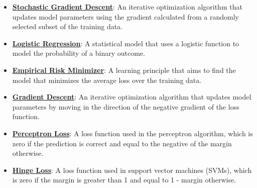 \documentclass{article}%
\begin{document}
\begin{itemize}[leftmargin=*]
\item \href{https://purdue.brightspace.com/d2l/common/assets/pdfjs-d2l-dist/1.0.14-legacy/web/viewer.html?file=%2Fcontent%2Fenforced%2F1095467-wl.202510.CS.24300.001%2F05L2-ML Basics.pdf%3Fou%3D1095467&lang=en-us&container=d2l-fileviewer-rendered-pdf&fullscreen=d2l-fileviewer-rendered-pdf-dialog&height=667#page=29}{\textbf{Stochastic Gradient Descent}}: An iterative optimization algorithm that updates model parameters using the gradient calculated from a randomly selected subset of the training data.%
\item \href{https://purdue.brightspace.com/d2l/common/assets/pdfjs-d2l-dist/1.0.14-legacy/web/viewer.html?file=%2Fcontent%2Fenforced%2F1095467-wl.202510.CS.24300.001%2F05L2-ML Basics.pdf%3Fou%3D1095467&lang=en-us&container=d2l-fileviewer-rendered-pdf&fullscreen=d2l-fileviewer-rendered-pdf-dialog&height=667#page=31}{\textbf{Logistic Regression}}: A statistical model that uses a logistic function to model the probability of a binary outcome.%
\item \href{https://purdue.brightspace.com/d2l/common/assets/pdfjs-d2l-dist/1.0.14-legacy/web/viewer.html?file=%2Fcontent%2Fenforced%2F1095467-wl.202510.CS.24300.001%2F05L2-ML Basics.pdf%3Fou%3D1095467&lang=en-us&container=d2l-fileviewer-rendered-pdf&fullscreen=d2l-fileviewer-rendered-pdf-dialog&height=667#page=15}{\textbf{Empirical Risk Minimizer}}: A learning principle that aims to find the model that minimizes the average loss over the training data.%
\item \href{https://purdue.brightspace.com/d2l/common/assets/pdfjs-d2l-dist/1.0.14-legacy/web/viewer.html?file=%2Fcontent%2Fenforced%2F1095467-wl.202510.CS.24300.001%2F05L2-ML Basics.pdf%3Fou%3D1095467&lang=en-us&container=d2l-fileviewer-rendered-pdf&fullscreen=d2l-fileviewer-rendered-pdf-dialog&height=667#page=28}{\textbf{Gradient Descent}}: An iterative optimization algorithm that updates model parameters by moving in the direction of the negative gradient of the loss function.%
\item \href{https://purdue.brightspace.com/d2l/common/assets/pdfjs-d2l-dist/1.0.14-legacy/web/viewer.html?file=%2Fcontent%2Fenforced%2F1095467-wl.202510.CS.24300.001%2F05L2-ML Basics.pdf%3Fou%3D1095467&lang=en-us&container=d2l-fileviewer-rendered-pdf&fullscreen=d2l-fileviewer-rendered-pdf-dialog&height=667#page=27}{\textbf{Perceptron Loss}}: A loss function used in the perceptron algorithm, which is zero if the prediction is correct and equal to the negative of the margin otherwise.%
\item \href{https://purdue.brightspace.com/d2l/common/assets/pdfjs-d2l-dist/1.0.14-legacy/web/viewer.html?file=%2Fcontent%2Fenforced%2F1095467-wl.202510.CS.24300.001%2F05L2-ML Basics.pdf%3Fou%3D1095467&lang=en-us&container=d2l-fileviewer-rendered-pdf&fullscreen=d2l-fileviewer-rendered-pdf-dialog&height=667#page=27}{\textbf{Hinge Loss}}: A loss function used in support vector machines (SVMs), which is zero if the margin is greater than 1 and equal to 1 - margin otherwise.%

\end{itemize}
\end{document}
